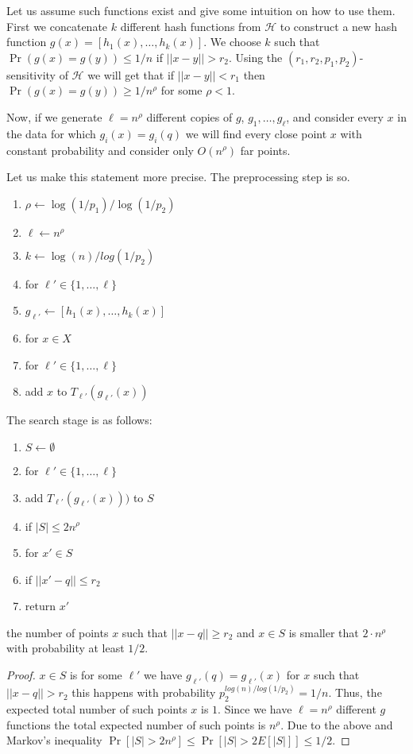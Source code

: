 \documentclass{article}
\begin{document}
Let us assume such functions exist and give some intuition on how to use them.
First we concatenate $k$ different hash functions from $\mathcal{H}$ 
to construct a new hash function $g(x) = [h_1(x),\ldots,h_k(x)]$.
We choose $k$ such that $\Pr(g(x)=g(y)) \le 1/n$ if $||x-y|| > r_2$.
Using the $(r_1,r_2,p_1,p_2)$-sensitivity of $\mathcal{H}$ we will get that
if $||x-y|| < r_1$ then $\Pr(g(x)=g(y)) \ge 1/n^{\rho}$ for some $\rho<1$.

Now, if we generate $\ell = n^{\rho}$ different copies of $g$, $g_1,\ldots,g_\ell$,
and consider every $x$ in the data for which $g_i(x)=g_i(q)$ we will 
find every close point $x$ with constant probability and consider only $O(n^\rho)$ far points.

Let us make this statement more precise.
The preprocessing step is so.
\begin{enumerate}
\item $\rho \leftarrow \log(1/p_1)/\log(1/p_2)$
\item $\ell \leftarrow n^{\rho}$
\item $k \leftarrow \log(n)/log(1/p_2)$
\item for $\ell' \in \{1,\ldots,\ell\}$
\item \tab $g_{\ell'} \leftarrow [h_1(x),\ldots,h_k(x)]$
\item for $x \in X$
\item \tab for $\ell' \in \{1,\ldots,\ell\} $
\item \tab \tab add $x$ to $T_{\ell'}(g_{\ell'}(x))$
\end{enumerate}

The search stage is as follows:
\begin{enumerate}
\item $S \leftarrow \emptyset$
\item for $\ell' \in \{1,\ldots,\ell\} $
\item  \tab add $T_{\ell'}(g_{\ell'}(x)))$ to $S$
\item if $|S| \le 2n^{\rho}$
\item \tab for $x' \in S$
\item \tab  \tab if $||x' - q|| \le r_2$
\item \tab \tab \tab return  $x'$
\end{enumerate}



\begin{fact}
the number of points $x$ such that $||x-q|| \ge r_2$ and $x \in S$ is smaller that
$2\cdot n^{\rho}$ with probability at least $1/2$. 
\end{fact}
\begin{proof}
$x \in S$ is for some $\ell'$ we have $g_{\ell'}(q)  = g_{\ell'}(x)$ for $x$ such that $||x-q||>r_2$
this happens with probability $p_{2}^{log(n)/log(1/p_2)} = 1/n$. Thus, the expected total number of 
such points $x$ is $1$. Since we have $\ell = n^{\rho}$ different $g$ functions the total expected number of such
points is $n^{\rho}$. Due to the above and Markov's inequality $\Pr[|S| > 2n^{\rho}] \le \Pr[|S| > 2E[|S|]] \le 1/2$.   
\end{proof}
\end{document}
